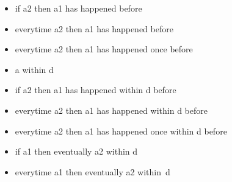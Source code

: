 \begin{itemize}
	\item
\begin{IMITATORproperty}
if a2 then a1 has happened before
\end{IMITATORproperty}

	\item
\begin{IMITATORproperty}
everytime a2 then a1 has happened before
\end{IMITATORproperty}

	\item
\begin{IMITATORproperty}
everytime a2 then a1 has happened once before
\end{IMITATORproperty}

	\item
\begin{IMITATORproperty}
a within d
\end{IMITATORproperty}

	\item
\begin{IMITATORproperty}
if a2 then a1 has happened within d before
\end{IMITATORproperty}

	\item
\begin{IMITATORproperty}
everytime a2 then a1 has happened within d before
\end{IMITATORproperty}

	\item
\begin{IMITATORproperty}
everytime a2 then a1 has happened once within d before
\end{IMITATORproperty}

	\item
\begin{IMITATORproperty}
if a1 then eventually a2 within d
\end{IMITATORproperty}

	\item
\begin{IMITATORproperty}
everytime a1 then eventually a2 within~d
\end{IMITATORproperty}


\end{itemize}
